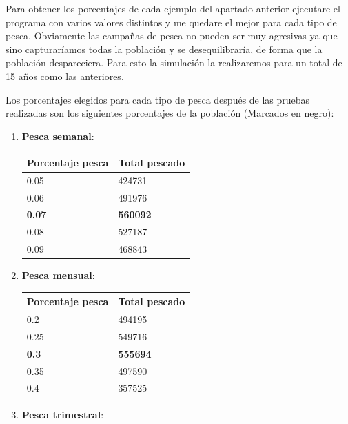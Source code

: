 \documentclass[]{article}
\begin{document}
Para obtener los porcentajes de cada ejemplo del apartado anterior ejecutare el programa con varios valores distintos y me quedare el mejor para cada tipo de pesca. Obviamente las campañas de pesca no pueden ser muy agresivas ya que sino capturaríamos todas la población y se desequilibraría, de forma que la población despareciera. Para esto la simulación la realizaremos para un total de 15 años como las anteriores.

Los porcentajes elegidos para cada tipo de pesca después de las pruebas realizadas son los siguientes porcentajes de la población (Marcados en negro):

\begin{enumerate}
	\item \textbf{Pesca semanal}:
	\begin{table}[H]
		\begin{center}
			\begin{tabular}{|l|l|}
				\hline
				Porcentaje pesca & Total pescado\\
				\hline \hline
				0.05 & 424731
				\\ \hline
				0.06 & 491976
				\\ \hline
				\textbf{0.07} & \textbf{560092}
				\\ \hline
				0.08 & 527187
				\\ \hline
				0.09 & 468843
				\\ \hline
			\end{tabular}
			\label{tabla:sencilla}
		\end{center}
	\end{table}
	\item \textbf{Pesca mensual}: 
	\begin{table}[H]
		\begin{center}
			\begin{tabular}{|l|l|}
				\hline
				Porcentaje pesca & Total pescado\\
				\hline \hline
				0.2 & 494195
				\\ \hline
				0.25 & 549716
				\\ \hline
				\textbf{0.3} & \textbf{555694}
				\\ \hline
				0.35 & 497590
				\\ \hline
				0.4 & 357525
				\\ \hline
			\end{tabular}
			\label{tabla:sencilla}
		\end{center}
	\end{table}
	\item \textbf{Pesca trimestral}:

\end{enumerate}
\end{document}
